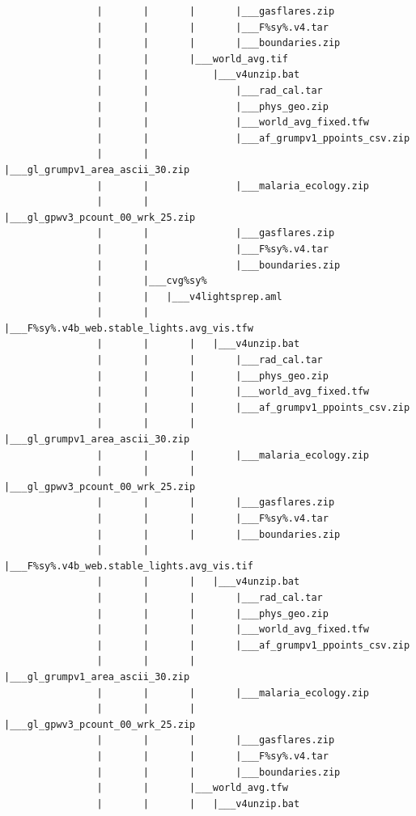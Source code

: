 \documentclass[]{book}
\begin{document}
\begin{verbatim}
                |       |       |       |___gasflares.zip
                |       |       |       |___F%sy%.v4.tar
                |       |       |       |___boundaries.zip
                |       |       |___world_avg.tif
                |       |           |___v4unzip.bat
                |       |               |___rad_cal.tar
                |       |               |___phys_geo.zip
                |       |               |___world_avg_fixed.tfw
                |       |               |___af_grumpv1_ppoints_csv.zip
                |       |               |___gl_grumpv1_area_ascii_30.zip
                |       |               |___malaria_ecology.zip
                |       |               |___gl_gpwv3_pcount_00_wrk_25.zip
                |       |               |___gasflares.zip
                |       |               |___F%sy%.v4.tar
                |       |               |___boundaries.zip
                |       |___cvg%sy%
                |       |   |___v4lightsprep.aml
                |       |       |___F%sy%.v4b_web.stable_lights.avg_vis.tfw
                |       |       |   |___v4unzip.bat
                |       |       |       |___rad_cal.tar
                |       |       |       |___phys_geo.zip
                |       |       |       |___world_avg_fixed.tfw
                |       |       |       |___af_grumpv1_ppoints_csv.zip
                |       |       |       |___gl_grumpv1_area_ascii_30.zip
                |       |       |       |___malaria_ecology.zip
                |       |       |       |___gl_gpwv3_pcount_00_wrk_25.zip
                |       |       |       |___gasflares.zip
                |       |       |       |___F%sy%.v4.tar
                |       |       |       |___boundaries.zip
                |       |       |___F%sy%.v4b_web.stable_lights.avg_vis.tif
                |       |       |   |___v4unzip.bat
                |       |       |       |___rad_cal.tar
                |       |       |       |___phys_geo.zip
                |       |       |       |___world_avg_fixed.tfw
                |       |       |       |___af_grumpv1_ppoints_csv.zip
                |       |       |       |___gl_grumpv1_area_ascii_30.zip
                |       |       |       |___malaria_ecology.zip
                |       |       |       |___gl_gpwv3_pcount_00_wrk_25.zip
                |       |       |       |___gasflares.zip
                |       |       |       |___F%sy%.v4.tar
                |       |       |       |___boundaries.zip
                |       |       |___world_avg.tfw
                |       |       |   |___v4unzip.bat

\end{verbatim}
\end{document}
